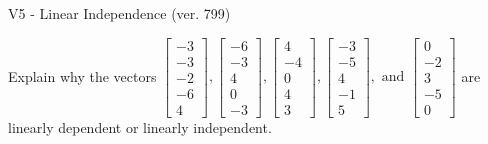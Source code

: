 \begin{exercise}
  \begin{exerciseTitle}V5 - Linear Independence (ver. 799)\end{exerciseTitle}
  \begin{exerciseStatement}
    Explain why the vectors \(\left[\begin{array}{r}
-3 \\
-3 \\
-2 \\
-6 \\
4
\end{array}\right] , \left[\begin{array}{r}
-6 \\
-3 \\
4 \\
0 \\
-3
\end{array}\right] , \left[\begin{array}{r}
4 \\
-4 \\
0 \\
4 \\
3
\end{array}\right] , \left[\begin{array}{r}
-3 \\
-5 \\
4 \\
-1 \\
5
\end{array}\right] , \text{ and } \left[\begin{array}{r}
0 \\
-2 \\
3 \\
-5 \\
0
\end{array}\right]\) are linearly dependent or linearly independent.	



\end{exerciseStatement}
\end{exercise}
